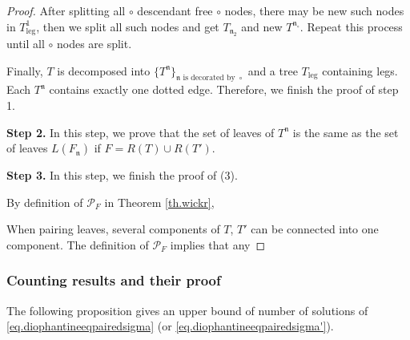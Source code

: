 \begin{proof}
After splitting all $\circ$ descendant free $\circ$ nodes, there may be new such nodes in $T_{\text{leg}}^{1}$, then we split all such nodes and get $T_{\mathfrak{n}_2}$ and new $T^{\mathfrak{n}_{\circ}}$. Repeat this process until all $\circ$ nodes are split. 

Finally, $T$ is decomposed into $\{T^{\mathfrak{n}}\}_{\mathfrak{n}\text{ is decorated by } \circ}$ and a tree $T_{\text{leg}}$ containing legs. Each $T^{\mathfrak{n}}$ contains exactly one dotted edge. Therefore, we finish the proof of step 1.


\textbf{Step 2.} In this step, we prove that the set of leaves of $T^{\mathfrak{n}}$ is the same as the set of leaves $L(F_{\mathfrak{n}})$ if $F=R(T)\cup R(T')$.





\textbf{Step 3.} In this step, we finish the proof of (3).

By definition of $\mathcal{P}_{F}$ in Theorem \ref{th.wickr}, 

When pairing leaves, several components of $T$, $T'$ can be connected into one component. The definition of $\mathcal{P}_F$ implies that any
\end{proof}


\subsubsection{Counting results and their proof}
The following proposition gives an upper bound of number of solutions of \eqref{eq.diophantineeqpairedsigma} (or \eqref{eq.diophantineeqpairedsigma'}).

